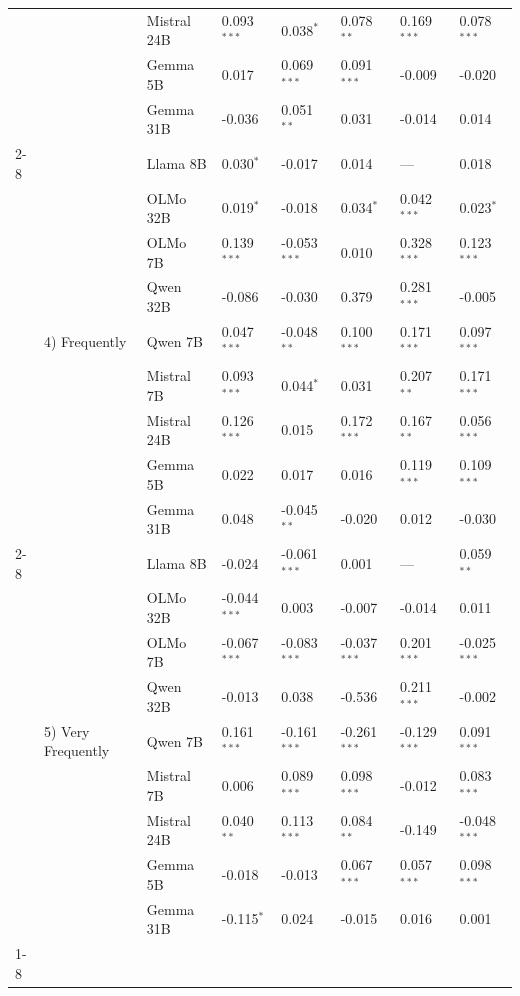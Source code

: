 \begin{longtable}[t]{llllllll}
 &  & Mistral 24B & 0.093$^{***}$ & 0.038$^{*}$ & 0.078$^{**}$ & 0.169$^{***}$ & 0.078$^{***}$ \\
 &  & Gemma 5B & 0.017 & 0.069$^{***}$ & 0.091$^{***}$ & -0.009 & -0.020 \\
 &  & Gemma 31B & -0.036 & 0.051$^{**}$ & 0.031 & -0.014 & 0.014 \\
\cline{2-8}
 & \multirow[t]{9}{*}{4) Frequently} & Llama 8B & 0.030$^{*}$ & -0.017 & 0.014 & --- & 0.018 \\
 &  & OLMo 32B & 0.019$^{*}$ & -0.018 & 0.034$^{*}$ & 0.042$^{***}$ & 0.023$^{*}$ \\
 &  & OLMo 7B & 0.139$^{***}$ & -0.053$^{***}$ & 0.010 & 0.328$^{***}$ & 0.123$^{***}$ \\
 &  & Qwen 32B & -0.086 & -0.030 & 0.379 & 0.281$^{***}$ & -0.005 \\
 &  & Qwen 7B & 0.047$^{***}$ & -0.048$^{**}$ & 0.100$^{***}$ & 0.171$^{***}$ & 0.097$^{***}$ \\
 &  & Mistral 7B & 0.093$^{***}$ & 0.044$^{*}$ & 0.031 & 0.207$^{**}$ & 0.171$^{***}$ \\
 &  & Mistral 24B & 0.126$^{***}$ & 0.015 & 0.172$^{***}$ & 0.167$^{**}$ & 0.056$^{***}$ \\
 &  & Gemma 5B & 0.022 & 0.017 & 0.016 & 0.119$^{***}$ & 0.109$^{***}$ \\
 &  & Gemma 31B & 0.048 & -0.045$^{**}$ & -0.020 & 0.012 & -0.030 \\
\cline{2-8}
 & \multirow[t]{9}{*}{5) Very Frequently} & Llama 8B & -0.024 & -0.061$^{***}$ & 0.001 & --- & 0.059$^{**}$ \\
 &  & OLMo 32B & -0.044$^{***}$ & 0.003 & -0.007 & -0.014 & 0.011 \\
 &  & OLMo 7B & -0.067$^{***}$ & -0.083$^{***}$ & -0.037$^{***}$ & 0.201$^{***}$ & -0.025$^{***}$ \\
 &  & Qwen 32B & -0.013 & 0.038 & -0.536 & 0.211$^{***}$ & -0.002 \\
 &  & Qwen 7B & 0.161$^{***}$ & -0.161$^{***}$ & -0.261$^{***}$ & -0.129$^{***}$ & 0.091$^{***}$ \\
 &  & Mistral 7B & 0.006 & 0.089$^{***}$ & 0.098$^{***}$ & -0.012 & 0.083$^{***}$ \\
 &  & Mistral 24B & 0.040$^{**}$ & 0.113$^{***}$ & 0.084$^{**}$ & -0.149 & -0.048$^{***}$ \\
 &  & Gemma 5B & -0.018 & -0.013 & 0.067$^{***}$ & 0.057$^{***}$ & 0.098$^{***}$ \\
 &  & Gemma 31B & -0.115$^{*}$ & 0.024 & -0.015 & 0.016 & 0.001 \\
\cline{1-8} \cline{2-8}
\end{longtable}
